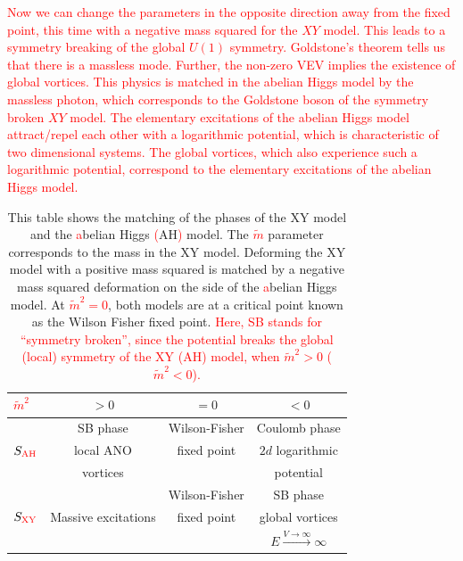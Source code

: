     \indent \textcolor{red}{Now we can change the parameters in the opposite direction away from the fixed point, this time with a negative mass squared for the $XY$ model. This leads to a symmetry breaking of the global $U(1)$ symmetry. Goldstone's theorem tells us that there is a massless mode. Further, the non-zero VEV implies the existence of global vortices. This physics is matched in the abelian Higgs model by the massless photon, which corresponds to the Goldstone boson of the symmetry broken $XY$ model. The elementary excitations of the abelian Higgs model attract/repel each other with a logarithmic potential, which is characteristic of two dimensional systems. The global vortices, which also experience such a logarithmic potential, correspond to the elementary excitations of the abelian Higgs model. }
    \begin{table}
\begin{center}
  \begin{tabular}{| l | c | c | c|}
      \hline
      \textcolor{red}{$\tilde{m}^2$}           &  $>0$                  & $=0$                           &  $<0$                                               \\\hline
                    &  SB phase              & Wilson-Fisher &  Coulomb phase                                      \\                             
      $S_{\text{\textcolor{red}{AH}}}$ &  local ANO             &  fixed point                   &  $2d$ logarithmic                                   \\                           
                    &  vortices              &                                &  potential                                          \\\hline
                    &     & Wilson-Fisher &  SB phase                                           \\                
      $S_{\text{\textcolor{red}{XY}}}$ &  Massive excitations                    & fixed point                    &  global vortices                                    \\                                  
                    &           &                                &  $E\xrightarrow{V \rightarrow \infty} \infty$       \\                      
    \hline
  \end{tabular}
\end{center}
        \caption[This table shows the matching of the phases of the XY model and the \textcolor{red}{a}belian Higgs model.]{This table shows the matching of the phases of the XY model and the \textcolor{red}{a}belian Higgs \textcolor{red}{(}AH\textcolor{red}{)} model. The \textcolor{red}{$\tilde{m}$} parameter corresponds to the mass in the XY model. Deforming the XY model with a positive mass squared is matched by a negative mass squared deformation on the side of the \textcolor{red}{a}belian Higgs model. At \textcolor{red}{$\tilde{m}^2=0$}, both models are at a critical point known as the Wilson Fisher fixed point. \textcolor{red}{Here, SB stands for ``symmetry broken'', since the potential breaks the global (local) symmetry of the XY (AH) model, when $\tilde{m}^2>0$ ($\tilde{m}^2<0$).} }

\end{table}
